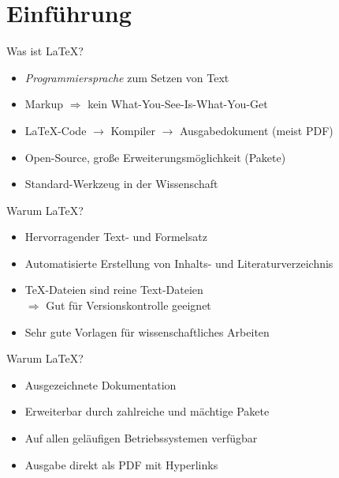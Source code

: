 \section{Einführung}


\begin{frame}{Was ist \LaTeX?}
  \Large
  \begin{itemize}
    \item \emph{Programmiersprache} zum Setzen von Text
    \item Markup $\Rightarrow$ kein 
      \textcolor{TUgreen}{W}hat-\textcolor{TUgreen}{Y}ou-\textcolor{TUgreen}{S}ee-\textcolor{TUgreen}{I}s-\textcolor{TUgreen}{W}hat-\textcolor{TUgreen}{Y}ou-\textcolor{TUgreen}{G}et

    \item \LaTeX-Code $\rightarrow$ Kompiler $\rightarrow$  Ausgabedokument (meist PDF)
    \item Open-Source, große Erweiterungsmöglichkeit (Pakete)
    \item Standard-Werkzeug in der Wissenschaft
  \end{itemize}
\end{frame}

\begin{frame}{Warum \LaTeX?}
  \Large
  \begin{itemize}
    \item Hervorragender Text- und Formelsatz
    \item Automatisierte Erstellung von Inhalts- und Literaturverzeichnis
    \item \TeX-Dateien sind reine Text-Dateien \\
        $\Rightarrow$ Gut für Versionskontrolle geeignet
    \item Sehr gute Vorlagen für wissenschaftliches Arbeiten
  \end{itemize}
\end{frame}

\begin{frame}{Warum \LaTeX?}
  \Large
  \begin{itemize}
    \item Ausgezeichnete Dokumentation
    \item Erweiterbar durch zahlreiche und mächtige Pakete
    \item Auf allen geläufigen Betriebssystemen verfügbar
    \item Ausgabe direkt als PDF mit Hyperlinks
  \end{itemize}
\end{frame}

